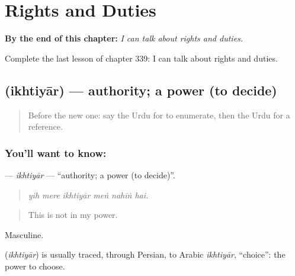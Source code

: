 
\chapter{Rights and Duties}
\label{ch:ur-rights-and-duties}

\begin{chapteropening}
\textbf{By the end of this chapter:} \emph{I can talk about rights and duties.}

Complete the last lesson of chapter 339: I can talk about rights and duties.
\end{chapteropening}

\section[\texorpdfstring{\ur{اختیار} (ikhtiyār)}{اختیار (ikhtiyār)}]{ (ikhtiyār) — authority; a power (to decide)}

\label{lesson:UR-C339-ikhtiyar}



\begin{quote}
Before the new one: say the Urdu for to enumerate, then the Urdu for a reference.
\end{quote}

\subsection*{You'll want to know: }
\textbf{} — \emph{ikhtiyār} — \textquotedblleft{}authority; a power (to decide)\textquotedblright{}.

\begin{quote}
     
\end{quote}

\begin{quote}
\emph{yih mere ikhtiyār meṅ nahīṅ hai.}
\end{quote}

\begin{quote}
This is not in my power.
\end{quote}

Masculine.

\begin{cousinweb}
\textbf{} (\emph{ikhtiyār}) is usually traced, through Persian, to Arabic \emph{ikhtiyār}, \textquotedblleft{}choice\textquotedblright{}: the power to choose.
\end{cousinweb}

